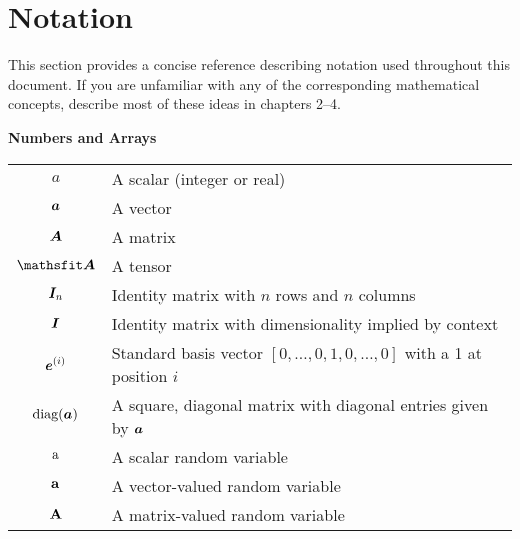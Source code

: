 \chapter*{Notation}
\label{notation}



This section provides a concise reference describing notation used throughout
this document.  If you are unfamiliar with any of the corresponding
mathematical concepts, \citet{dlbook} describe most of these ideas in chapters
2--4.

\vspace{\notationgap}
\begin{minipage}{0.9\textwidth}
  \centerline{\bf Numbers and Arrays}
  \bgroup
  \def\arraystretch{1.5}
  \begin{tabular}{cp{3.25in}}
    $\displaystyle a$ & A scalar (integer or real)\\
    $\displaystyle {\bm{a}}$ & A vector\\
    $\displaystyle {\bm{A}}$ & A matrix\\
    $\displaystyle \tA$ & A tensor\\
    $\displaystyle {\bm{I}}_n$ & Identity matrix with $n$ rows and $n$ columns\\
    $\displaystyle {\bm{I}}$ & Identity matrix with dimensionality implied by context\\
    $\displaystyle {\bm{e}}^{(i)}$ & Standard basis vector $[0,\dots,0,1,0,\dots,0]$ with a 1 at position $i$\\
    $\displaystyle \text{diag}({\bm{a}})$ & A square, diagonal matrix with diagonal entries given by ${\bm{a}}$\\
    $\displaystyle {\textnormal{a}}$ & A scalar random variable\\
    $\displaystyle {\mathbf{a}}$ & A vector-valued random variable\\
    $\displaystyle {\mathbf{A}}$ & A matrix-valued random variable\\
  \end{tabular}
  \egroup
\end{minipage}

